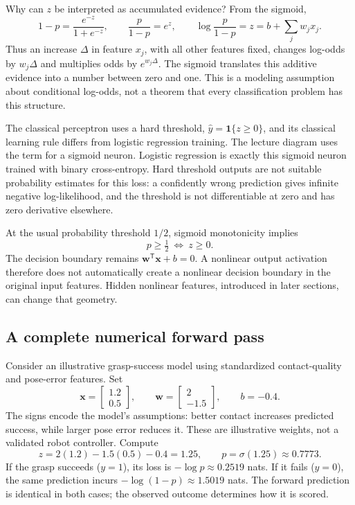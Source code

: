 Why can $z$ be interpreted as accumulated evidence? From the sigmoid,
\[
 1-p=\frac{e^{-z}}{1+e^{-z}},\qquad
 \frac{p}{1-p}=e^z,\qquad
 \log\frac{p}{1-p}=z=b+\sum_jw_jx_j.
\]
Thus an increase $\Delta$ in feature $x_j$, with all other features fixed, changes log-odds by $w_j\Delta$ and multiplies odds by $e^{w_j\Delta}$. The sigmoid translates this additive evidence into a number between zero and one. This is a modeling assumption about conditional log-odds, not a theorem that every classification problem has this structure.

\begin{warning}
The classical perceptron uses a hard threshold, $\hat y=\mathbf{1}\{z\geq0\}$, and its classical learning rule differs from logistic regression training. The lecture diagram uses the term for a sigmoid neuron. Logistic regression is exactly this sigmoid neuron trained with binary cross-entropy. Hard threshold outputs are not suitable probability estimates for this loss: a confidently wrong prediction gives infinite negative log-likelihood, and the threshold is not differentiable at zero and has zero derivative elsewhere.
\end{warning}

At the usual probability threshold $1/2$, sigmoid monotonicity implies
\[
 p\geq\tfrac12\ \Longleftrightarrow\ z\geq0.
\]
The decision boundary remains $\mathbf{w}^{\mathsf T}\mathbf{x}+b=0$. A nonlinear output activation therefore does not automatically create a nonlinear decision boundary in the original input features. Hidden nonlinear features, introduced in later sections, can change that geometry.

\subsection{A complete numerical forward pass}
Consider an illustrative grasp-success model using standardized contact-quality and pose-error features. Set
\[
 \mathbf{x}=\begin{bmatrix}1.2\\0.5\end{bmatrix},\qquad
 \mathbf{w}=\begin{bmatrix}2\\-1.5\end{bmatrix},\qquad b=-0.4.
\]
The signs encode the model's assumptions: better contact increases predicted success, while larger pose error reduces it. These are illustrative weights, not a validated robot controller. Compute
\[
 z=2(1.2)-1.5(0.5)-0.4=1.25,\qquad p=\sigma(1.25)\approx0.7773.
\]
If the grasp succeeds ($y=1$), its loss is $-\log p\approx0.2519$ nats. If it fails ($y=0$), the same prediction incurs $-\log(1-p)\approx1.5019$ nats. The forward prediction is identical in both cases; the observed outcome determines how it is scored.

